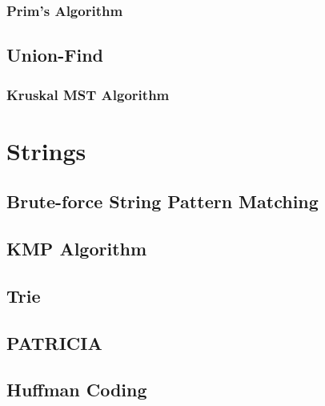\documentclass{article}
\begin{document}
\subsubsection{Prim's Algorithm}

\subsection{Union-Find}

\subsubsection{Kruskal MST Algorithm}

\section{Strings}

\subsection{Brute-force String Pattern Matching}

\subsection{KMP Algorithm}

\subsection{Trie}

\subsection{PATRICIA}

\subsection{Huffman Coding}
\end{document}
